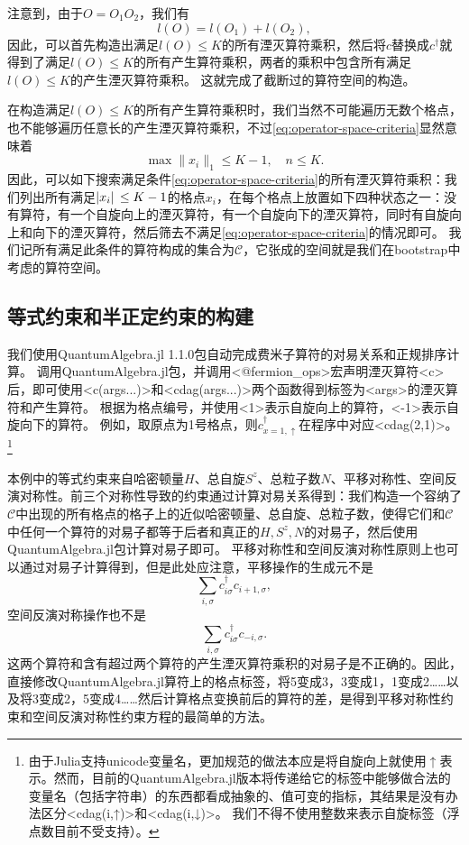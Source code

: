 \documentclass[oneside]{fduthesis}
\def\texttt#1{<#1>}%
\begin{document}
注意到，由于$O = O_1 O_2$，我们有
\begin{equation}
    l(O) = l(O_1) + l(O_2),
\end{equation}
因此，可以首先构造出满足$l(O) \leq K$的所有湮灭算符乘积，然后将$c$替换成$c^\dagger$就得到了满足$l(O) \leq K$的所有产生算符乘积，两者的乘积中包含所有满足$l(O) \leq K$的产生湮灭算符乘积。
这就完成了截断过的算符空间的构造。

在构造满足$l(O) \leq K$的所有产生算符乘积时，我们当然不可能遍历无数个格点，也不能够遍历任意长的产生湮灭算符乘积，不过\eqref{eq:operator-space-criteria}显然意味着
\begin{equation}
    \max \| x_i \|_1 \leq K - 1, \quad n \leq K.
    \label{eq:inequality-hubbard-opstr}
\end{equation}
因此，可以如下搜索满足条件\eqref{eq:operator-space-criteria}的所有湮灭算符乘积：我们列出所有满足$\abs*{x_i} \leq K - 1$的格点$x_i$，在每个格点上放置如下四种状态之一：没有算符，有一个自旋向上的湮灭算符，有一个自旋向下的湮灭算符，同时有自旋向上和向下的湮灭算符，然后筛去不满足\eqref{eq:operator-space-criteria}的情况即可。
我们记所有满足此条件的算符构成的集合为$\mathcal{C}$，它张成的空间就是我们在bootstrap中考虑的算符空间。

\subsection{等式约束和半正定约束的构建}\label{sec:symbolic-hubbard}

我们使用QuantumAlgebra.jl 1.1.0包\cite{Sanchez-Barquilla2020,QuantumAlgebra.jl}自动完成费米子算符的对易关系和正规排序计算。
调用QuantumAlgebra.jl包，并调用\texttt{@fermion\_ops}宏声明湮灭算符\texttt{c}后，即可使用\texttt{c(args...)}和\texttt{cdag(args...)}两个函数得到标签为\texttt{args}的湮灭算符和产生算符。
根据为格点编号，并使用\texttt{1}表示自旋向上的算符，\texttt{-1}表示自旋向下的算符。
例如，取原点为1号格点，则$c^\dagger_{x = 1, \uparrow}$在程序中对应\texttt{cdag(2,1)}。%
\footnote{
    由于Julia支持unicode变量名，更加规范的做法本应是将自旋向上就使用$\uparrow$表示。然而，目前的QuantumAlgebra.jl版本将传递给它的标签中能够做合法的变量名（包括字符串）的东西都看成抽象的、值可变的指标，其结果是没有办法区分\texttt{cdag(i,↑)}和\texttt{cdag(i,↓)}。
    我们不得不使用整数来表示自旋标签（浮点数目前不受支持）。
}%

本例中的等式约束来自哈密顿量$H$、总自旋$S^z$、总粒子数$N$、平移对称性、空间反演对称性。前三个对称性导致的约束通过计算对易关系得到：我们构造一个容纳了$\mathcal{C}$中出现的所有格点的格子上的近似哈密顿量、总自旋、总粒子数，使得它们和$\mathcal{C}$中任何一个算符的对易子都等于后者和真正的$H, S^z, N$的对易子，然后使用QuantumAlgebra.jl包计算对易子即可。
平移对称性和空间反演对称性原则上也可以通过对易子计算得到，但是此处应注意，平移操作的生成元不是
\[
    \sum_{i, \sigma} c^\dagger_{i \sigma} c_{i + 1, \sigma},
\]
空间反演对称操作也不是
\[
    \sum_{i, \sigma} c^\dagger_{i \sigma} c_{-i, \sigma}.
\]
这两个算符和含有超过两个算符的产生湮灭算符乘积的对易子是不正确的。因此，直接修改QuantumAlgebra.jl算符上的格点标签，将5变成3，3变成1，1变成2……以及将3变成2，5变成4……然后计算格点变换前后的算符的差，是得到平移对称性约束和空间反演对称性约束方程的最简单的方法。
\end{document}
